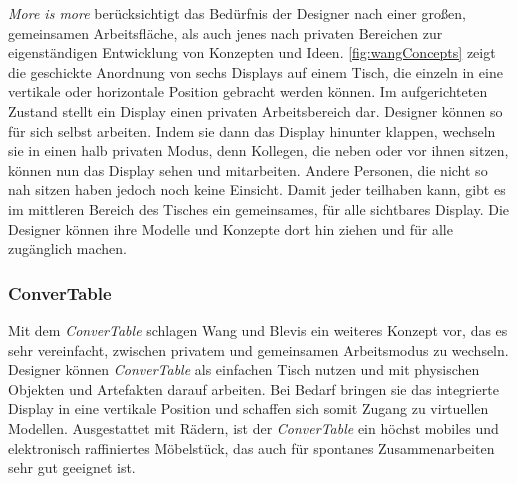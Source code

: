 \emph{More is more} berücksichtigt das Bedürfnis der Designer nach einer großen, gemeinsamen Arbeitsfläche, als auch jenes nach privaten Bereichen zur eigenständigen Entwicklung von Konzepten und Ideen. \autoref{fig:wangConcepts} zeigt die geschickte Anordnung von sechs Displays auf einem Tisch, die einzeln in eine vertikale oder horizontale Position gebracht werden können. Im aufgerichteten Zustand stellt ein Display einen privaten Arbeitsbereich dar. Designer können so für sich selbst arbeiten. Indem sie dann das Display hinunter klappen, wechseln sie in einen halb privaten Modus, denn Kollegen, die neben oder vor ihnen sitzen, können nun das Display sehen und mitarbeiten. Andere Personen, die nicht so nah sitzen haben jedoch noch keine Einsicht. Damit jeder teilhaben kann, gibt es im mittleren Bereich des Tisches ein gemeinsames, für alle sichtbares Display. Die Designer können ihre Modelle und Konzepte dort hin ziehen und für alle zugänglich machen.

\subsubsection{ConverTable}

Mit dem \emph{ConverTable} schlagen Wang und Blevis ein weiteres Konzept vor, das es sehr vereinfacht, zwischen privatem und gemeinsamen Arbeitsmodus zu wechseln. Designer können \emph{ConverTable} als einfachen Tisch nutzen und mit physischen Objekten und Artefakten darauf arbeiten. Bei Bedarf bringen sie das integrierte Display in eine vertikale Position und schaffen sich somit Zugang zu virtuellen Modellen. Ausgestattet mit Rädern, ist der \emph{ConverTable} ein höchst mobiles und elektronisch raffiniertes Möbelstück, das auch für spontanes Zusammenarbeiten sehr gut geeignet ist.

